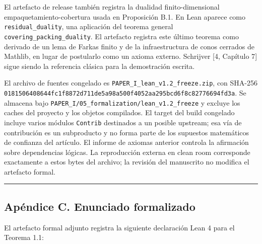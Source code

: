 \documentclass[spanish,11pt,a4paper]{article}
\begin{document}
El artefacto de release también registra la dualidad finito-dimensional
empaquetamiento-cobertura usada en Proposición B.1. En Lean aparece como
\nolinkurl{residual_duality}, una aplicación del teorema general
\nolinkurl{covering_packing_duality}. El artefacto registra este último
teorema como derivado de un lema de Farkas finito y de la
infraestructura de conos cerrados de Mathlib, en lugar de postularlo
como un axioma externo. Schrijver {[}4, Capítulo 7{]} sigue siendo la
referencia clásica para la demostración escrita.

El archivo de fuentes congelado es
\nolinkurl{PAPER_I_lean_v1.2_freeze.zip}, con SHA-256
\nolinkurl{0181506408644fc1f8872d711de5a98a500f4052aa295bcd6f8c82776694fd3a}.
Se almacena bajo \nolinkurl{PAPER_I/05_formalization/lean_v1.2_freeze}
y excluye los caches del proyecto y los objetos compilados. El target
del build congelado incluye varios módulos \nolinkurl{Contrib} destinados a
un posible upstream; esa vía de contribución es un subproducto y no
forma parte de los supuestos matemáticos de confianza del artículo. El
informe de axiomas anterior controla la afirmación sobre dependencias
lógicas. La reproducción externa en clean room corresponde exactamente a
estos bytes del archivo; la revisión del manuscrito no modifica el
artefacto formal.

\begin{center}\rule{0.5\linewidth}{0.5pt}\end{center}

\subsection{Apéndice C. Enunciado
formalizado}\label{apuxe9ndice-c.-enunciado-formalizado}

El artefacto formal adjunto registra la siguiente declaración Lean 4
para el Teorema 1.1:
\end{document}

